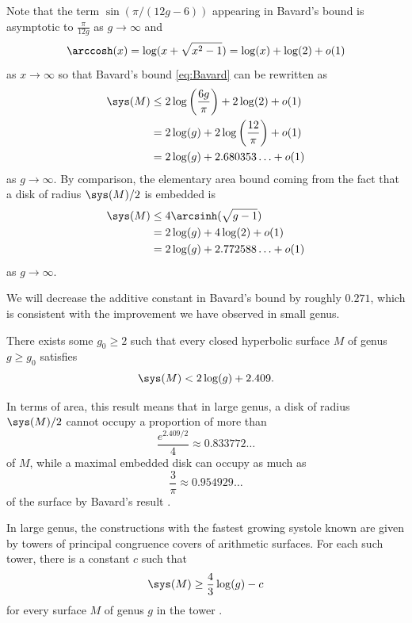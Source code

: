 \documentclass[12pt]{amsart}
\numberwithin{equation}{section}
\begin{document}
Note that the term $\sin(\pi / (12g-6))$ appearing in Bavard's bound is asymptotic to $\frac{\pi}{12 g}$ as $g \to \infty$ and \[\arccosh(x)=\log(x+\sqrt{x^2 - 1}) = \log(x)+\log(2) + o(1)\] as $x \to \infty$ so that Bavard's bound \eqref{eq:Bavard} can be rewritten as
\begin{align*}
\sys(M) &\leq 2 \log\left( \frac{6g}{\pi}\right)+2\log(2)+o(1) \\
&= 2\log(g) + 2\log\left( \frac{12}{\pi} \right) + o(1) \\
&= 2\log(g) + 2.680353\ldots + o(1)
\end{align*}
as $g \to \infty$. By comparison, the elementary area bound coming from the fact that a disk of radius $\sys(M)/2$ is embedded is
\begin{align*}
\sys(M) &\leq 4 \arcsinh(\sqrt{g-1}) \\
&= 2\log(g) + 4 \log(2) + o(1) \\
&= 2\log(g) + 2.772588\ldots + o(1)
\end{align*}
as $g \to \infty$.

We will decrease the additive constant in Bavard's bound by roughly $0.271$, which is consistent with the improvement we have observed in small genus. 

\begin{thm} \label{thm:systole_asymp}
There exists some $g_0 \geq 2$ such that every closed hyperbolic surface $M$ of genus $g\geq g_0$ satisfies
\[
\sys(M) < 2\log(g) + 2.409.
\]
\end{thm}

\begin{rem}
In terms of area, this result means that in large genus, a disk of radius $\sys(M)/2$ cannot occupy a proportion of more than
\[
\frac{e^{2.409/2}}{4} \approx 0.833772\ldots
\]
of $M$, while a maximal embedded disk can occupy as much as 
\[
\frac{3}{\pi} \approx 0.954929\ldots
\]
of the surface by Bavard's result \cite{Bavard}.
\end{rem}

\begin{rem}
In large genus, the constructions with the fastest growing systole known are given by towers of principal congruence covers of arithmetic surfaces. For each such tower, there is a constant $c$ such that
\[
\sys(M) \geq \frac43 \log(g) - c 
\]
for every surface $M$ of genus $g$ in the tower \cite[Theorem 1.5]{KSV}.
\end{rem}
\end{document}
